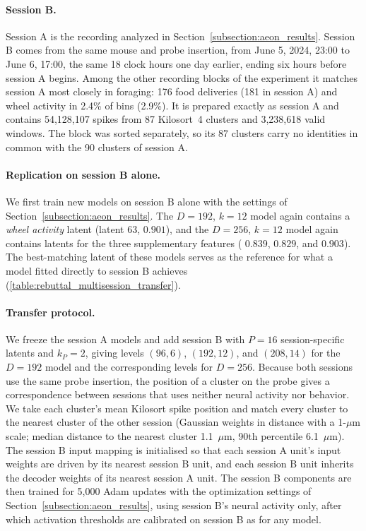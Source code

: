 \paragraph{Session B.}
Session A is the recording analyzed in Section~\ref{subsection:aeon_results}. Session B comes from the same mouse and probe insertion, from June 5, 2024, 23:00 to June 6, 17:00, the same 18 clock hours one day earlier, ending six hours before session A begins. Among the other recording blocks of the experiment it matches session A most closely in foraging: 176 food deliveries (181 in session A) and wheel activity in 2.4\% of bins (2.9\%). It is prepared exactly as session A and contains 54,128,107 spikes from 87 Kilosort~4 clusters and 3,238,618 valid windows. The block was sorted separately, so its 87 clusters carry no identities in common with the 90 clusters of session A.

\paragraph{Replication on session B alone.}
We first train new models on session B alone with the settings of Section~\ref{subsection:aeon_results}. The $D=192$, $k=12$ model again contains a \textit{wheel activity} latent (latent 63,  $0.901$), and the $D=256$, $k=12$ model again contains latents for the three supplementary features ( $0.839$, $0.829$, and $0.903$). The best-matching latent of these models serves as the reference for what a model fitted directly to session B achieves (\autoref{table:rebuttal_multisession_transfer}).

\paragraph{Transfer protocol.}
We freeze the session A models and add session B with $P=16$ session-specific latents and $k_P=2$, giving levels $(96,6)$, $(192,12)$, and $(208,14)$ for the $D=192$ model and the corresponding levels for $D=256$. Because both sessions use the same probe insertion, the position of a cluster on the probe gives a correspondence between sessions that uses neither neural activity nor behavior. We take each cluster's mean Kilosort spike position and match every cluster to the nearest cluster of the other session (Gaussian weights in distance with a 1-$\mu$m scale; median distance to the nearest cluster 1.1~$\mu$m, 90th percentile 6.1~$\mu$m). The session B input mapping is initialised so that each session A unit's input weights are driven by its nearest session B unit, and each session B unit inherits the decoder weights of its nearest session A unit. The session B components are then trained for 5,000 Adam updates with the optimization settings of Section~\ref{subsection:aeon_results}, using session B's neural activity only, after which activation thresholds are calibrated on session B as for any model.

